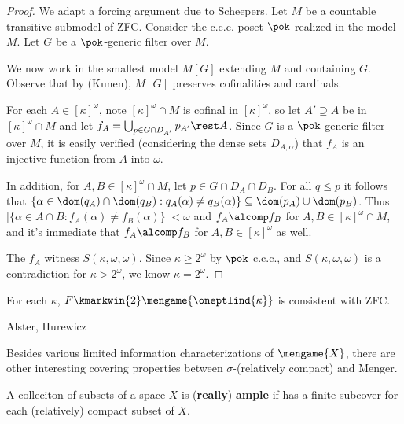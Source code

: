   \begin{proof}
    We adapt a forcing argument due to Scheepers. Let $M$ be a countable transitive submodel of ZFC. Consider the c.c.c. poset $\pok$ realized in the model $M$. Let $G$ be a $\pok$-generic filter over $M$.

    We now work in the smallest model $M[G]$ extending $M$ and containing $G$. Observe that by (Kunen), $M[G]$ preserves cofinalities and cardinals.

    For each $A\in [\kappa]^\omega$, note $[\kappa]^\omega\cap M$ is cofinal in $[\kappa]^\omega$, so let $A'\supseteq A$ be in $[\kappa]^\omega\cap M$ and let $f_A=\bigcup_{p\in G\cap D_{A'}}p_{A'}\rest A$. Since $G$ is a $\pok$-generic filter over $M$, it is easily verified (considering the dense sets $D_{A,\alpha}$) that $f_A$ is an injective function from $A$ into $\omega$.

    In addition, for $A,B\in [\kappa]^\omega\cap M$, let $p\in G\cap D_A\cap D_B$. For all $q\leq p$ it follows that $\{\alpha\in \dom(q_A)\cap \dom(q_B): q_A(\alpha)\not= q_B(\alpha)\} \subseteq \dom(p_A)\cup\dom(p_B)$. Thus $|\{\alpha\in A\cap B: f_A(\alpha)\not= f_B(\alpha)\}|<\omega$ and $f_A\alcomp f_B$ for $A,B\in [\kappa]^\omega\cap M$, and it's immediate that $f_A\alcomp f_B$ for $A,B\in[\kappa]^\omega$ as well.

    The $f_A$ witness $S(\kappa,\omega,\omega)$. Since $\kappa\geq 2^\omega$ by $\pok$ c.c.c., and $S(\kappa,\omega,\omega)$ is a contradiction for $\kappa>2^\omega$, we know $\kappa=2^\omega$. 
  \end{proof}

  \begin{cor}
    For each $\kappa$, $F\kmarkwin{2}\mengame{\oneptlind{\kappa}}$ is consistent with ZFC.
  \end{cor}









\newpage

  \centerline{Alster, Hurewicz}

  Besides various limited information characterizations of $\mengame{X}$, there are other interesting covering properties between $\sigma$-(relatively compact) and Menger.

  \begin{defn}
    A colleciton of subsets of a space $X$ is (\textbf{really}) \textbf{ample} if has a finite subcover for each (relatively) compact subset of $X$.
  \end{defn}

